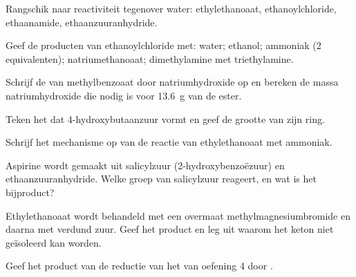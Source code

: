 \begin{exercise}[$\star$]\label{exo:b2:acyl-substitution:1}
Rangschik naar reactiviteit tegenover water: ethylethanoaat, ethanoylchloride, ethaanamide,
ethaanzuuranhydride.
\end{exercise}

\begin{exercise}[$\star$]\label{exo:b2:acyl-substitution:2}
Geef de producten van ethanoylchloride met: water; ethanol; ammoniak (2 equivalenten);
natriumethanoaat; dimethylamine met triethylamine.
\end{exercise}

\begin{exercise}[$\star$]\label{exo:b2:acyl-substitution:3}
Schrijf de  van methylbenzoaat door natriumhydroxide op en bereken de massa natriumhydroxide
die nodig is voor \qty{13.6}{g} van de ester.
\end{exercise}

\begin{exercise}[$\star$]\label{exo:b2:acyl-substitution:4}
Teken het  dat 4-hydroxybutaanzuur vormt en geef de grootte van zijn ring.
\end{exercise}

\begin{exercise}[$\star\star$]\label{exo:b2:acyl-substitution:5}
Schrijf het mechanisme op van de reactie van ethylethanoaat met ammoniak.
\end{exercise}

\begin{exercise}[$\star\star$]\label{exo:b2:acyl-substitution:6}
Aspirine wordt gemaakt uit salicylzuur (2-hydroxybenzoëzuur) en ethaanzuuranhydride. Welke groep
van salicylzuur reageert, en wat is het bijproduct?
\end{exercise}

\begin{exercise}[$\star\star$]\label{exo:b2:acyl-substitution:7}
Ethylethanoaat wordt behandeld met een overmaat methylmagnesiumbromide en daarna met verdund zuur. Geef het
product en leg uit waarom het keton niet geïsoleerd kan worden.
\end{exercise}

\begin{exercise}[$\star\star$]\label{exo:b2:acyl-substitution:8}
Geef het product van de reductie van het  van oefening 4 door .
\end{exercise}

